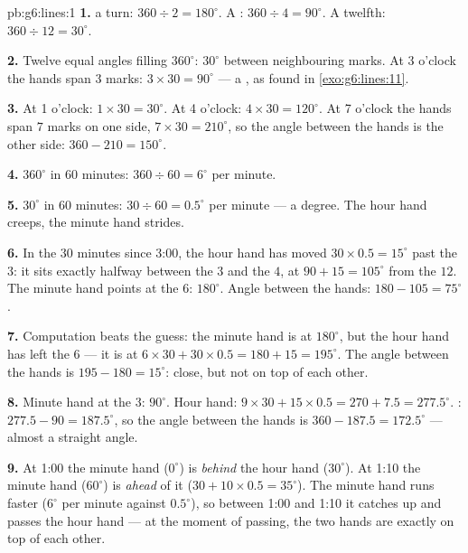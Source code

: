 \begin{solution}{pb:g6:lines:1}
\textbf{1.}  a turn: $360 \div 2 = 180^\circ$. A :
$360 \div 4 = 90^\circ$. A twelfth: $360 \div 12 = 30^\circ$.

\textbf{2.} Twelve equal angles filling $360^\circ$:
$30^\circ$ between neighbouring marks. At 3 o'clock the hands
span $3$ marks: $3 \times 30 = 90^\circ$ --- a , as
found in \cref{exo:g6:lines:11}.

\textbf{3.} At 1 o'clock: $1 \times 30 = 30^\circ$. At
4 o'clock: $4 \times 30 = 120^\circ$. At 7 o'clock the hands
span $7$ marks on one side, $7 \times 30 = 210^\circ$, so the
angle between the hands is the other side:
$360 - 210 = 150^\circ$.

\textbf{4.} $360^\circ$ in $60$ minutes: $360 \div 60 =
6^\circ$ per minute.

\textbf{5.} $30^\circ$ in $60$ minutes: $30 \div 60 = 0.5^\circ$
per minute ---  a degree. The hour hand creeps, the minute
hand strides.

\textbf{6.} In the $30$ minutes since 3:00, the hour hand has
moved $30 \times 0.5 = 15^\circ$ past the $3$: it sits exactly
halfway between the $3$ and the $4$, at $90 + 15 = 105^\circ$
from the $12$. The minute hand points at the $6$:
$180^\circ$. Angle between the hands:
$180 - 105 = 75^\circ$.

\textbf{7.} Computation beats the guess: the minute hand is at
$180^\circ$, but the hour hand has left the $6$ --- it is at
$6 \times 30 + 30 \times 0.5 = 180 + 15 = 195^\circ$. The angle
between the hands is $195 - 180 = 15^\circ$: close, but not on
top of each other.

\textbf{8.} Minute hand at the $3$: $90^\circ$. Hour hand:
$9 \times 30 + 15 \times 0.5 = 270 + 7.5 = 277.5^\circ$.
: $277.5 - 90 = 187.5^\circ$, so the angle between the
hands is $360 - 187.5 = 172.5^\circ$ --- almost a straight
angle.

\textbf{9.} At 1:00 the minute hand ($0^\circ$) is \emph{behind}
the hour hand ($30^\circ$). At 1:10 the minute hand
($60^\circ$) is \emph{ahead} of it
($30 + 10 \times 0.5 = 35^\circ$). The minute hand runs faster
($6^\circ$ per minute against $0.5^\circ$), so between 1:00 and
1:10 it catches up and passes the hour hand --- at the moment of
passing, the two hands are exactly on top of each other.


\end{solution}
